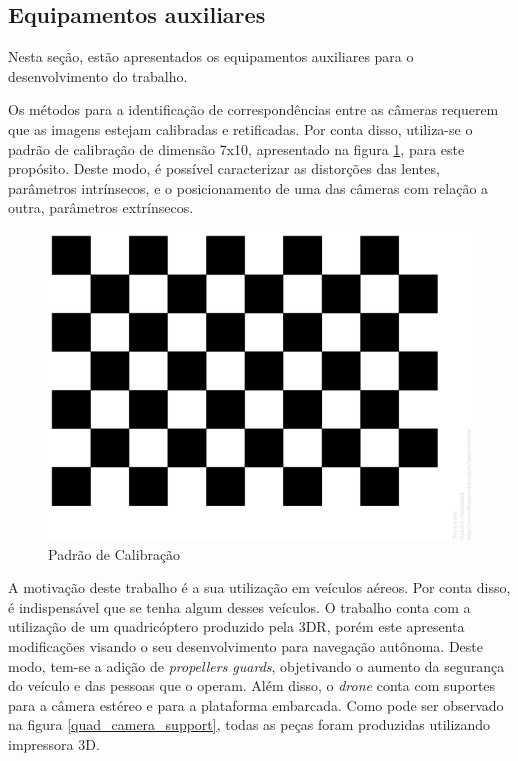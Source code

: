 \subsection{Equipamentos auxiliares}

Nesta seção, estão apresentados os equipamentos auxiliares para o desenvolvimento do trabalho. 

Os métodos para a identificação de correspondências entre as câmeras requerem que as imagens estejam calibradas e retificadas. Por conta disso, utiliza-se o padrão de calibração de dimensão 7x10, apresentado na figura \ref{calibration_pattern}, para este propósito. Deste modo, é possível caracterizar as distorções das lentes, parâmetros intrínsecos, e o posicionamento de uma das câmeras com relação a outra, parâmetros extrínsecos.  

\begin{figure}[H]
	\centering
	\includegraphics[scale=0.10]{./Resources/calibration_pattern.png}
	\caption{Padrão de Calibração}
	\label{calibration_pattern}
\end{figure}

A motivação deste trabalho é a sua utilização em veículos aéreos. Por conta disso, é indispensável que se tenha algum desses veículos. O trabalho conta com a utilização de um quadricóptero produzido pela 3DR\texttrademark \cite{3DRX8}, porém este apresenta modificações visando o seu desenvolvimento para navegação autônoma. Deste modo, tem-se a adição de \textit{propellers guards}, objetivando o aumento da segurança do veículo e das pessoas que o operam. Além disso, o \textit{drone} conta com suportes para a câmera estéreo e para a plataforma embarcada. Como pode ser observado na figura \ref{quad_camera_support}, todas as peças foram produzidas utilizando impressora 3D.

